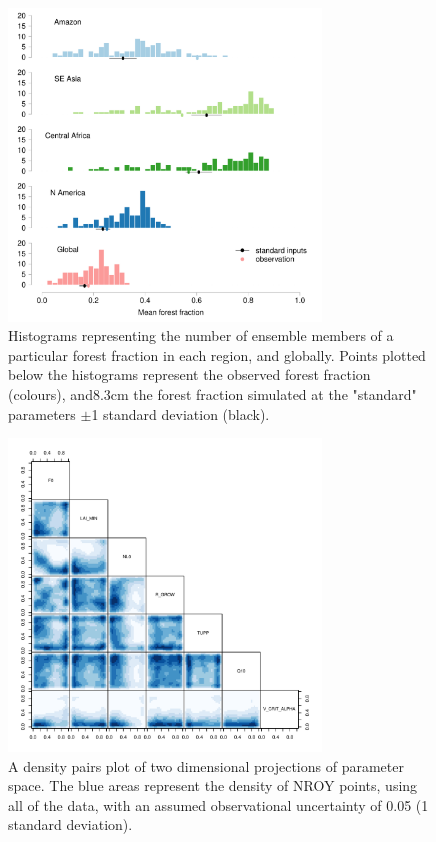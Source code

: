 \documentclass[esd, article]{copernicus} %
\begin{document}
\begin{figure}[t]
\includegraphics[width=8.3cm]{graphics/fraction_histogram_with_discrepancy_standard.pdf}
\caption{Histograms representing the number of ensemble members of a particular forest fraction in each region, and globally. Points plotted below the histograms represent the observed forest fraction (colours), and8.3cm the forest fraction simulated at the "standard" parameters $\pm$1 standard deviation (black).}
\label{fig:fraction_histogram_with_discrepancy_standard}
\end{figure}

\begin{figure}[t]
\includegraphics[width=8.3cm]{graphics/credible_NROY.pdf}
\caption{A density pairs plot of two dimensional projections of parameter space. The blue areas represent the density of NROY points, using all of the data, with an assumed observational uncertainty of 0.05 (1 standard deviation).}
\label{fig:credible_NROY}
\end{figure}
\end{document}
